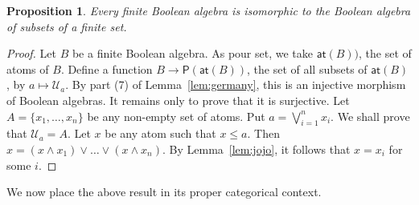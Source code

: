 \documentclass[a4paper]{amsart}
\newtheorem{proposition}[theorem]{Proposition}
\begin{document}
\begin{proposition}\label{prop:finite} 
Every finite Boolean algebra is isomorphic to the Boolean algebra of subsets of a finite set.
\end{proposition}
\begin{proof} Let $B$ be a finite Boolean algebra.
As pour set, we take $\mathsf{at}(B))$, the set of atoms of $B$.
Define a function $B \rightarrow \mathsf{P}(\mathsf{at}(B))$, the set of all subsets of $\mathsf{at}(B)$, by $a \mapsto \mathscr{U}_{a}$.
By part (7) of  Lemma~\ref{lem:germany}, this is an injective morphism of Boolean algebras.
It remains only to prove that it is surjective.
Let $A = \{x_{1}, \ldots, x_{n}\}$ be any non-empty set of atoms.
Put $a = \bigvee_{i=1}^{n} x_{i}$.
We shall prove that $\mathscr{U}_{a} = A$.
Let $x$ be any atom such that $x \leq a$.
Then $x = (x \wedge x_{1}) \vee \ldots \vee (x \wedge x_{n})$.
By Lemma~\ref{lem:jojo}, it follows that $x = x_{i}$ for some $i$.
\end{proof}

We now place the above result in its proper categorical context.
\end{document}
